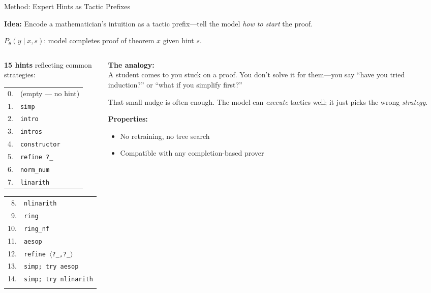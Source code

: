 \documentclass[aspectratio=169, 11pt]{beamer}
\begin{document}
\begin{frame}{Method: Expert Hints as Tactic Prefixes}

\textbf{Idea:} Encode a mathematician's intuition as a tactic prefix---tell the model \emph{how to start} the proof.

\vspace{0.2em}
$P_\theta(y \mid x, s)$: model completes proof of theorem $x$ given hint $s$.

\vspace{0.3em}
\begin{columns}[T]
\begin{column}{0.42\textwidth}
\textbf{15 hints} reflecting common strategies:
\vspace{0.2em}

{\small
\begin{tabular}{@{}rl@{}}
0. & (empty --- no hint) \\
1. & \texttt{simp} \\
2. & \texttt{intro} \\
3. & \texttt{intros} \\
4. & \texttt{constructor} \\
5. & \texttt{refine ?\_} \\
6. & \texttt{norm\_num} \\
7. & \texttt{linarith} \\
\end{tabular}
\hspace{0.3em}
\begin{tabular}{@{}rl@{}}
8. & \texttt{nlinarith} \\
9. & \texttt{ring} \\
10. & \texttt{ring\_nf} \\
11. & \texttt{aesop} \\
12. & \texttt{refine $\langle$?\_,?\_$\rangle$} \\
13. & \texttt{simp; try aesop} \\
14. & \texttt{simp; try nlinarith} \\
& \\
\end{tabular}
}
\end{column}
\begin{column}{0.54\textwidth}
\textbf{The analogy:}\\[0.3em]
A student comes to you stuck on a proof. You don't solve it for them---you say ``have you tried induction?'' or ``what if you simplify first?''

\vspace{0.5em}
That small nudge is often enough. The model can \emph{execute} tactics well; it just picks the wrong \emph{strategy}.

\vspace{0.5em}
\textbf{Properties:}
\begin{itemize}
    \item No retraining, no tree search
    \item Compatible with any completion-based prover
\end{itemize}
\end{column}
\end{columns}
\end{frame}
\end{document}

